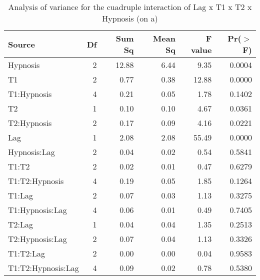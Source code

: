 \documentclass{article}
\begin{document}
% 
\begin{table}
\caption{Analysis of variance for the cuadruple interaction of Lag x T1 x T2 x Hypnosis (on a)}
\centering
\begin{tabular}{lrrrrr}
  \hline
Source & Df & Sum Sq & Mean Sq & F value & Pr($>$F) \\ 
  \hline
  \rowcolor{Gray}
Hypnosis    & 2 & 12.88 & 6.44 & 9.35 & 0.0004 \\
\rowcolor{Gray}
  T1        & 2 & 0.77 & 0.38 & 12.88 & 0.0000 \\ 
  T1:Hypnosis & 4 & 0.21 & 0.05 & 1.78 & 0.1402 \\
  \rowcolor{Gray}
  T2        & 1 & 0.10 & 0.10 & 4.67 & 0.0361 \\
  \rowcolor{Gray}
  T2:Hypnosis & 2 & 0.17 & 0.09 & 4.16 & 0.0221 \\
  \rowcolor{Gray}
  Lag        & 1 & 2.08 & 2.08 & 55.49 & 0.0000 \\ 
  Hypnosis:Lag & 2 & 0.04 & 0.02 & 0.54 & 0.5841 \\ 
  T1:T2        & 2 & 0.02 & 0.01 & 0.47 & 0.6279 \\ 
  T1:T2:Hypnosis & 4 & 0.19 & 0.05 & 1.85 & 0.1264 \\ 
  T1:Lag        & 2 & 0.07 & 0.03 & 1.13 & 0.3275 \\ 
  T1:Hypnosis:Lag & 4 & 0.06 & 0.01 & 0.49 & 0.7405 \\ 
  T2:Lag        & 1 & 0.04 & 0.04 & 1.35 & 0.2513 \\ 
  T2:Hypnosis:Lag & 2 & 0.07 & 0.04 & 1.13 & 0.3326 \\ 
  T1:T2:Lag        & 2 & 0.00 & 0.00 & 0.04 & 0.9583 \\ 
  T1:T2:Hypnosis:Lag & 4 & 0.09 & 0.02 & 0.78 & 0.5380 \\ 
   \hline
\end{tabular}
\end{table}
\end{document}
